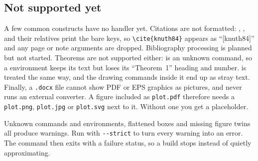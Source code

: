 \subsection{Not supported yet}

A few common constructs have no handler yet. Citations are not formatted:
, ,  and their  relatives print
the bare keys, so \texttt{\textbackslash cite\{knuth84\}} appears as
``[knuth84]'' and any page or note arguments are dropped. Bibliography
processing is planned but not started. Theorems are not supported either:
 is an unknown command, so a  environment keeps its
text but loses its ``Theorem~1'' heading and number.  is
treated the same way, and the drawing commands inside it end up as stray text.
Finally, a \texttt{.docx} file cannot show PDF or EPS graphics as pictures, and
\texdocx{} never runs an external converter. A figure included as
\texttt{plot.pdf} therefore needs a \texttt{plot.png}, \texttt{plot.jpg} or
\texttt{plot.svg} next to it. Without one you get a placeholder.

\begin{tip}
Unknown commands and environments, flattened boxes and missing figure twins
all produce warnings. Run \texdocx{} with \texttt{-{}-strict} to turn every
warning into an error. The command then exits with a failure status, so a build
stops instead of quietly approximating.
\end{tip}
